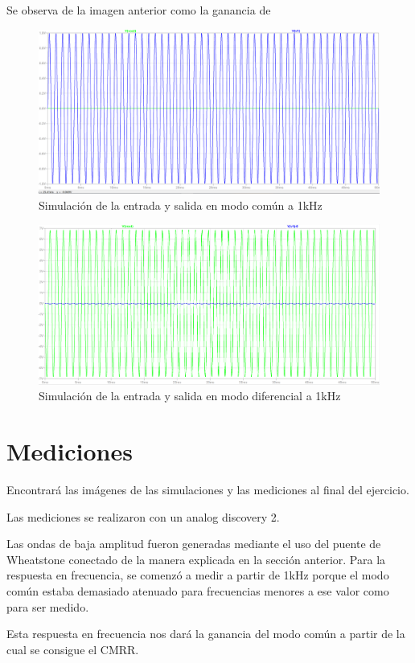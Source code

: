 \documentclass[../../tc_tp3_main.tex]{subfiles}
\begin{document}
	Se observa de la imagen anterior como la ganancia de
	\begin{figure}[h!]	
		\centering
		\includegraphics[scale=0.4]{imagenes/ganancia_comun_simulado.png}
		\caption{Simulación de la entrada y salida en modo común a 1kHz}
		\label{fig:ej3_ganancia_comun_simulado}
	\end{figure}
	
	\begin{figure}[h!]	
		\centering
		\includegraphics[scale=0.4]{imagenes/ganancia_diferencial_simulado.png}
		\caption{Simulación de la entrada y salida en modo diferencial a 1kHz}
		\label{fig:ej3_ganancia_diferencial_simulado}
	\end{figure}
	
\section{Mediciones}

Encontrará las imágenes de las simulaciones y las mediciones al final del ejercicio.\par

Las mediciones se realizaron con un analog discovery 2.\par
Las ondas de baja amplitud fueron generadas mediante el uso del puente de Wheatstone conectado de la manera explicada en la sección anterior.
Para la respuesta en frecuencia, se comenzó a medir a partir de 1kHz porque el modo común estaba demasiado atenuado para frecuencias menores a ese valor como para ser medido. \par
Esta respuesta en frecuencia nos dará la ganancia del modo común a partir de la cual se consigue el CMRR.
\end{document}
